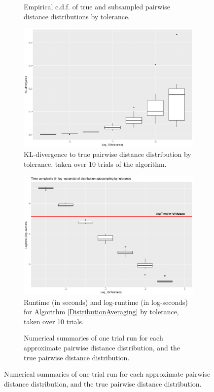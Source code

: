 \documentclass{article}
\begin{document}
\begin{figure}
\begin{subfigure}{.5\textwidth}
    	\caption{Empirical c.d.f. of true and subsampled pairwise distance distributions by tolerance.}
    	\label{fig:NNECDF}
    \end{subfigure}
    \begin{subfigure}{.5\textwidth}
        \includegraphics[width=\linewidth]{Figures/NearestNeighbor/CDR3/div_by_tol.pdf}
    	\caption{KL-divergence to true pairwise distance distribution by tolerance, taken over 10 trials of the algorithm.}
    	\label{fig:NNDivergences}
	\end{subfigure}
    \begin{subfigure}{.5\textwidth}
    	\includegraphics[width=0.9\linewidth]{Figures/NearestNeighbor/CDR3/log_time_by_tol.pdf}
    	\caption{Runtime (in seconds) and log-runtime (in log-seconds) for Algorithm \ref{DistributionAveraging} by tolerance, taken over 10 trials.}
    	\label{fig:NNTimes}
    \end{subfigure}
    \begin{subfigure}[H]{\textwidth}
    	\vspace{1em}
		
		\caption{Numerical summaries of one trial run for each approximate pairwise distance distribution, and the true pairwise distance distribution.}
		\label{tab:NNSummaryTable}
    \end{subfigure}
\end{figure}
\end{document}
